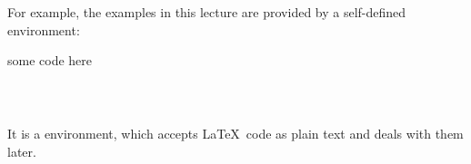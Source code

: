 \begin{frame}[fragile]

For example, the examples in this lecture are provided by a self-defined  environment:
\begin{example}
\begin{LCL}
\newenvironment{latexexample}
{\VerbatimOut{\jobname.tmp}}
{\endVerbatimOut
\begin{example}
~
\inputminted{latex}{\jobname.tmp}


\end{example}
}
\begin{latexexample}
  some code here
\end{latexexample}
\end{LCL}
\end{example}

It is a  environment, which accepts \LaTeX\ code as plain text and deals with them later.

\end{frame}
